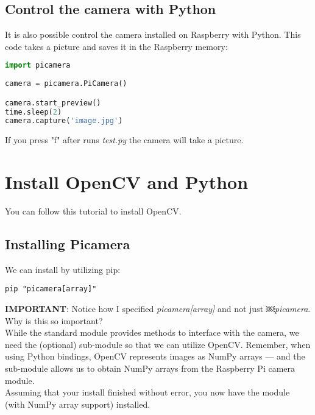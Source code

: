 \documentclass[12pt]{article}%
\begin{document}
	\subsection{Control the camera with Python}
		It is also possible control the camera installed on Raspberry with Python.
		This code takes a picture and saves it in the Raspberry memory:
		
		\begin{lstlisting}[language=Python]
import picamera	
	
camera = picamera.PiCamera()

camera.start_preview()
time.sleep(2)
camera.capture('image.jpg')
	\end{lstlisting}
	If you press "f" after runs \textit{test.py} \cite{code} the camera will take a picture.
	
\section{Install OpenCV and Python}
	You can follow this tutorial \cite{tut1} to install OpenCV.\\

	\subsection{Installing Picamera}
	We can install by utilizing pip:
	\begin{lstlisting}
pip "picamera[array]"
	\end{lstlisting}	 
	\textbf{IMPORTANT}: Notice how I specified \textit{picamera[array]} and not just ￼\textit{picamera}.\\
	Why is this so important?\\
	While the standard module provides methods to interface with the camera, we need the (optional) sub-module so that we can utilize OpenCV. Remember, when using Python bindings, OpenCV represents images as NumPy arrays — and the sub-module allows us to obtain NumPy arrays from the Raspberry Pi camera module.\\
	Assuming that your install finished without error, you now have the module (with NumPy array support) installed.
	
\end{document}
